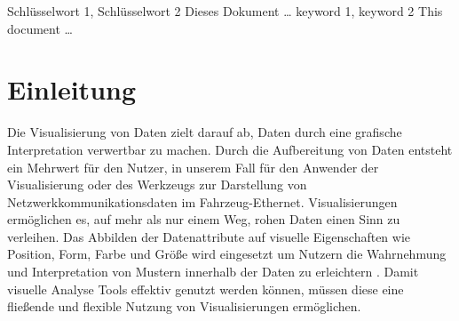 \documentclass[draft=false
              ,paper=a4
              ,twoside=false
              ,fontsize=11pt
              ,headsepline
              ,BCOR10mm
              ,DIV11
              ]{scrbook}
\begin{document}


\frontmatter

\maketitle

\onehalfspacing

\HAWAbstractPage
{Schlüsselwort 1, Schlüsselwort 2}%
{Dieses Dokument \ldots}
{keyword 1, keyword 2}%
{This document \ldots}

\newpage
\singlespacing

\tableofcontents
\newpage
\listoffigures

\mainmatter
\onehalfspacing

\chapter{Einleitung} %
\label{cha:einleitung}
Die Visualisierung von Daten zielt darauf ab, Daten durch eine grafische Interpretation verwertbar zu machen. Durch die Aufbereitung von Daten entsteht ein Mehrwert für den Nutzer, in unserem Fall für den Anwender der Visualisierung oder des Werkzeugs zur Darstellung von Netzwerkkommunikationsdaten im Fahrzeug-Ethernet. Visualisierungen ermöglichen es, auf mehr als nur einem Weg, rohen Daten einen Sinn zu verleihen. Das Abbilden der Datenattribute auf visuelle Eigenschaften wie Position, Form, Farbe und Größe wird eingesetzt um Nutzern die Wahrnehmung und Interpretation von Mustern innerhalb der Daten zu erleichtern \cite{shneiderman_designing_2005}. Damit visuelle Analyse Tools effektiv genutzt werden können, müssen diese eine fließende und flexible Nutzung von Visualisierungen ermöglichen. 
\end{document}
